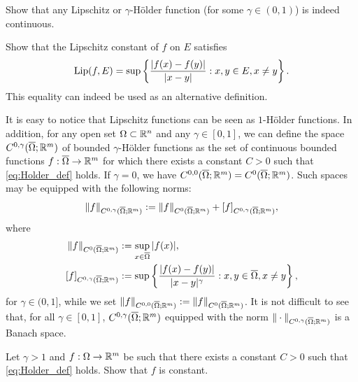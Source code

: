 \begin{exercise}
Show that any Lipschitz or $\gamma$-H\"older function (for some $\gamma \in (0,1)$) is indeed continuous.
\end{exercise}

\begin{exercise}
Show that the Lipschitz constant of $f$ on $E$ satisfies
\begin{equation}
\operatorname{Lip}(f, E) = \sup \left \{ \frac{|f(x) - f(y)|}{|x - y|} : x, y \in E, x \neq y \right \}.
\end{equation}
This equality can indeed be used as an alternative definition.
\end{exercise}

\begin{remark} \label{rem:Lip_Holder}
It is easy to notice that Lipschitz functions can be seen as $1$-H\"older functions. In addition, for any open set $\Omega \subset \mathbb{R}^{n}$ and any $\gamma \in [0, 1]$, we can define the space $C^{0, \gamma}(\overline{\Omega}; \mathbb{R}^{m})$ of bounded $\gamma$-H\"older functions as the set of continuous bounded functions $f : \overline{\Omega} \to \mathbb{R}^{m}$ for which there exists a constant $C > 0$ such that \eqref{eq:Holder_def} holds. If $\gamma = 0$, we have $C^{0, 0}(\overline{\Omega}; \mathbb{R}^{m}) = C^{0}(\overline{\Omega}; \mathbb{R}^{m})$. Such spaces may be equipped with the following norms:
\begin{equation*}
\|f\|_{C^{0, \gamma}(\overline{\Omega}; \mathbb{R}^{m})} := \|f\|_{C^{0}(\overline{\Omega}; \mathbb{R}^{m})} + [f]_{C^{0, \gamma}(\overline{\Omega}; \mathbb{R}^{m})},
\end{equation*}
where
\begin{align*}
\|f\|_{C^{0}(\overline{\Omega}; \mathbb{R}^{m})} & := \sup_{x \in \overline{\Omega}} |f(x)|, \\
[f]_{C^{0, \gamma}(\overline{\Omega}; \mathbb{R}^{m})} & := \sup \left \{ \frac{|f(x) - f(y)|}{|x - y|^{\gamma}} : x, y \in \overline{\Omega}, x \neq y \right \},
\end{align*}
for $\gamma \in (0, 1]$, while we set $\|f\|_{C^{0, 0}(\overline{\Omega}; \mathbb{R}^{m})} := \|f\|_{C^{0}(\overline{\Omega}; \mathbb{R}^{m})}$.
It is not difficult to see that, for all $\gamma \in [0, 1]$, $C^{0, \gamma}(\overline{\Omega}; \mathbb{R}^{m})$ equipped with the norm $\|\cdot \|_{C^{0, \gamma}(\overline{\Omega}; \mathbb{R}^{m})}$ is a Banach space.
\end{remark}

\begin{exercise}
Let $\gamma > 1$ and $f: \Omega \to \mathbb{R}^{m}$ be such that there exists a constant $C > 0$ such that \eqref{eq:Holder_def} holds. Show that $f$ is constant.
\end{exercise}

